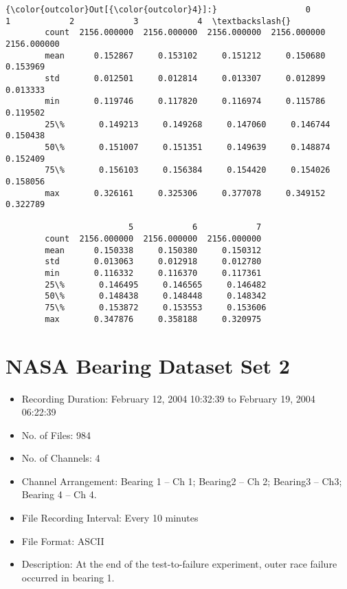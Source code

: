 \documentclass[11pt]{article}
\providecommand{\tightlist}{%
      \setlength{\itemsep}{0pt}\setlength{\parskip}{0pt}}
\begin{document}
\begin{Verbatim}[commandchars=\\\{\}]
{\color{outcolor}Out[{\color{outcolor}4}]:}                  0            1            2            3            4  \textbackslash{}
        count  2156.000000  2156.000000  2156.000000  2156.000000  2156.000000   
        mean      0.152867     0.153102     0.151212     0.150680     0.153969   
        std       0.012501     0.012814     0.013307     0.012899     0.013333   
        min       0.119746     0.117820     0.116974     0.115786     0.119502   
        25\%       0.149213     0.149268     0.147060     0.146744     0.150438   
        50\%       0.151007     0.151351     0.149639     0.148874     0.152409   
        75\%       0.156103     0.156384     0.154420     0.154026     0.158056   
        max       0.326161     0.325306     0.377078     0.349152     0.322789   
        
                         5            6            7  
        count  2156.000000  2156.000000  2156.000000  
        mean      0.150338     0.150380     0.150312  
        std       0.013063     0.012918     0.012780  
        min       0.116332     0.116370     0.117361  
        25\%       0.146495     0.146565     0.146482  
        50\%       0.148438     0.148448     0.148342  
        75\%       0.153872     0.153553     0.153606  
        max       0.347876     0.358188     0.320975  
\end{Verbatim}
            
    \section{NASA Bearing Dataset Set 2}\label{nasa-bearing-dataset-set-2}

\begin{itemize}
\tightlist
\item
  Recording Duration: February 12, 2004 10:32:39 to February 19, 2004
  06:22:39
\item
  No. of Files: 984
\item
  No. of Channels: 4
\item
  Channel Arrangement: Bearing 1 -- Ch 1; Bearing2 -- Ch 2; Bearing3 --
  Ch3; Bearing 4 -- Ch 4.
\item
  File Recording Interval: Every 10 minutes
\item
  File Format: ASCII
\item
  Description: At the end of the test-to-failure experiment, outer race
  failure occurred in bearing 1.
\end{itemize}
\end{document}
